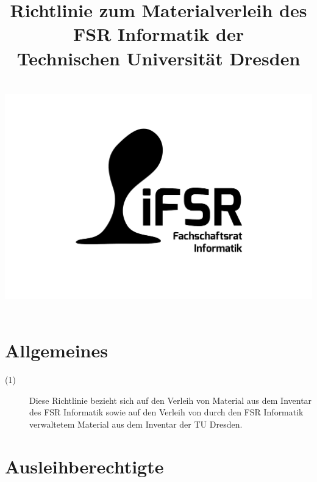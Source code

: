 \documentclass[a4paper]{article}
\newcommand{\iFSR}{FSR Informatik}
\newcommand{\TUD}{TU Dresden}
\begin{document}
\title{\bf Richtlinie zum Materialverleih des \\
        \iFSR{} der\\
        Technischen Universität Dresden\\~\\
      \includegraphics[width=.3\textwidth]{fsrlogo}
}

\maketitle

\pagebreak
\tableofcontents

\section{Allgemeines}

\begin{description}
\item[(1)] Diese Richtlinie bezieht sich auf den Verleih von Material aus dem Inventar des \iFSR{} sowie auf den Verleih von durch den \iFSR{} verwaltetem Material aus dem Inventar der \TUD.
\end{description}

\section{Ausleihberechtigte}
\end{document}
